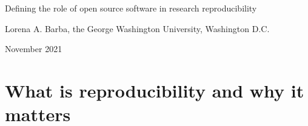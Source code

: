 \documentclass{statement}
\newlength{\up}
\begin{document}

\renewcommand{\thepage} {\arabic{page}}

\thispagestyle{empty}

{ \Huge Defining the role of open source software in research reproducibility} 
\medskip

Lorena A. Barba, the George Washington University, Washington D.C. 

November 2021



\vspace{1cm}

\begin{abstract}
Reproducibility is inseparable from transparency, as sharing data, code and computational environment is a pre-requisite for being able to retrace the steps of producing the research results. 
Others have made the case that this artifact sharing should adopt appropriate licensing schemes that permit reuse, modification and redistribution. 
I make a new proposal for the role of open source software, stemming from the lessons it teaches about distributed collaboration and a commitment-based culture. 
Reviewing the defining features of open source software (licensing, development, communities), I look for explanation of its success from the perspectives of connectivism---a learning theory for the digital age---and the language-action framework of Winograd and Flores. 
I contend that reproducibility is about trust, which we build in community via conversations, and open source software is a route to learn how to be more effective learning (discovering) together.
\end{abstract}

\section*{What is reproducibility and why it matters}
\vspace{\up}
\end{document}
